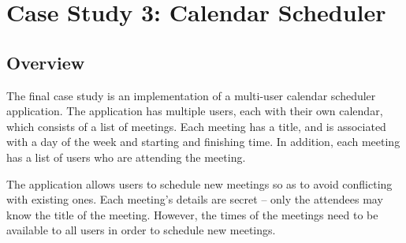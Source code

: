 \section{Case Study 3: Calendar Scheduler} \label{sect_cs_csched}

%
%
%
%
%
%
%
%
%
%
%
%
%
%
%

\subsection{Overview}

The final case study is an implementation of a multi-user calendar scheduler application. The application has multiple users, each with their own calendar, which consists of a list of meetings. Each meeting has a title, and is associated with a day of the week and starting and finishing time. In addition, each meeting has a list of users who are attending the meeting.

The application allows users to schedule new meetings so as to avoid conflicting with existing ones. Each meeting's details are secret -- only the attendees may know the title of the meeting. However, the times of the meetings need to be available to all users in order to schedule new meetings.

